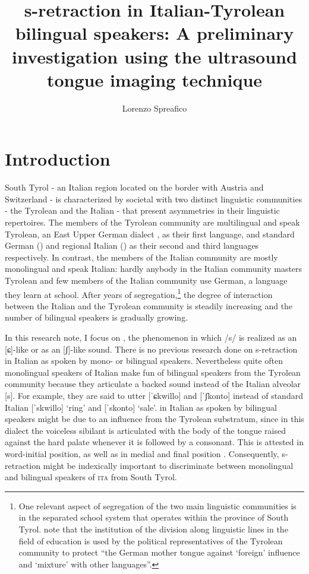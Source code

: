 \documentclass[output=paper]{LSP/langsci}
\author{Lorenzo Spreafico\affiliation{Free University of Bozen-Bolzano}}
\title{s-retraction in Italian-Tyrolean bilingual speakers: A preliminary investigation using the ultrasound tongue imaging technique}
\begin{document}
  
\section{Introduction}
South Tyrol - an Italian region located on the border with Austria and Switzerland - is characterized by societal  with two distinct linguistic communities - the Tyrolean and the Italian - that present asymmetries in their linguistic repertoires. The members of the Tyrolean community are multilingual and speak Tyrolean, an East Upper German dialect \citep{wiesinger_einteilung_1983,russ_central_1990}, as their first language, and standard German (\citealt{ciccolone_lo_2010}) and regional Italian (\citealt{mioni_litaliano_2001}) as their second and third languages respectively. In contrast, the members of the Italian community are mostly monolingual and speak Italian: hardly anybody in the Italian community masters Tyrolean and few members of the Italian community use German, a language they learn at school. After years of segregation,\footnote{One relevant aspect of segregation of the two main linguistic communities is in the separated school system that operates within the province of South Tyrol. \citet[237]{woelk_educational_2008} note that the institution of the division along linguistic lines in the field of education is used by the political representatives of the Tyrolean community to protect “the German mother tongue against `foreign' influence and `mixture' with other languages”.} the degree of interaction between the Italian and the Tyrolean community is steadily increasing and the number of bilingual speakers is gradually growing.

In this research note, I focus on , the phenomenon in which /s/ is realized as an [ɕ]-like or as an [ʃ]-like sound. There is no previous research done on s-retraction in Italian as spoken by mono- or bilingual speakers. Nevertheless quite often monolingual speakers of Italian make fun of bilingual speakers from the Tyrolean community because they articulate a backed sound instead of the Italian alveolar [s]. For example, they are said to utter [ˈɕkwillo] and [ˈʃkonto] instead of standard Italian [ˈskwillo] `ring' and [ˈskonto] `sale'.  in Italian as spoken by bilingual speakers might be due to an influence from the Tyrolean substratum, since in this dialect the voiceless sibilant is articulated with the body of the tongue raised against the hard palate whenever it is followed by a consonant. This is attested in word-initial position, as well as in medial and final position \citep{alber_regional_2001,alber_silbenonset_2005}. Consequently, s-retraction might be indexically important to discriminate between monolingual and bilingual speakers of \textsc{ita} from South Tyrol.
\end{document}
